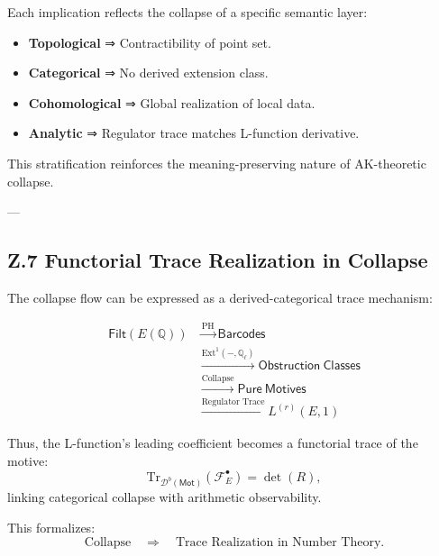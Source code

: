 Each implication reflects the collapse of a specific semantic layer:

\begin{itemize}
  \item \textbf{Topological} ⇒ Contractibility of point set.
  \item \textbf{Categorical} ⇒ No derived extension class.
  \item \textbf{Cohomological} ⇒ Global realization of local data.
  \item \textbf{Analytic} ⇒ Regulator trace matches L-function derivative.
\end{itemize}

This stratification reinforces the meaning-preserving nature of AK-theoretic collapse.

---

\subsection*{Z.7 Functorial Trace Realization in Collapse}

The collapse flow can be expressed as a derived-categorical trace mechanism:

\begin{align*}
\mathsf{Filt}(E(\mathbb{Q})) 
&\xrightarrow{\mathrm{PH}} \mathsf{Barcodes} \\
&\xrightarrow{\text{Ext}^1(-, \mathbb{Q}_\ell)} \mathsf{Obstruction~Classes} \\
&\xrightarrow{\text{Collapse}} \mathsf{Pure~Motives} \\
&\xrightarrow{\text{Regulator~Trace}} L^{(r)}(E,1)
\end{align*}

Thus, the L-function’s leading coefficient becomes a functorial trace of the motive:
\[
\mathrm{Tr}_{\mathcal{D}^b(\mathsf{Mot})}(\mathcal{F}_E^\bullet) = \det(R),
\]
linking categorical collapse with arithmetic observability.

This formalizes:
\[
\text{Collapse} \quad \Rightarrow \quad \text{Trace Realization in Number Theory}.
\]



